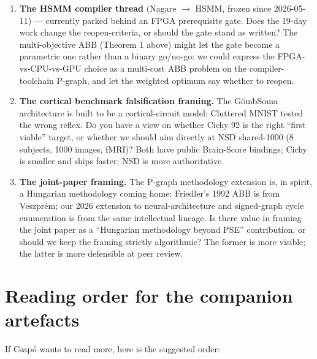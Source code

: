 \documentclass[11pt,a4paper]{article}
\theoremstyle{plain}
\theoremstyle{definition}
\begin{document}
\begin{enumerate}
\item \textbf{The HSMM compiler thread} (Nagare $\to$ HSMM, frozen
      since 2026-05-11) — currently parked behind an FPGA
      prerequisite gate. Does the 19-day work change the
      reopen-criteria, or should the gate stand as written? The
      multi-objective ABB (Theorem 1 above) might let the gate
      become a parametric one rather than a binary go/no-go: we
      could express the FPGA-vs-CPU-vs-GPU choice as a multi-cost
      ABB problem on the compiler-toolchain P-graph, and let the
      weighted optimum say whether to reopen.
\item \textbf{The cortical benchmark falsification framing.} The
      GömbSoma architecture is built to be a cortical-circuit
      model; Cluttered MNIST tested the wrong reflex. Do you have
      a view on whether Cichy 92 is the right ``first viable''
      target, or whether we should aim directly at NSD shared-1000
      (8 subjects, 1000 images, fMRI)? Both have public Brain-Score
      bindings; Cichy is smaller and ships faster; NSD is more
      authoritative.
\item \textbf{The joint-paper framing.} The P-graph methodology
      extension is, in spirit, a Hungarian methodology coming home:
      Friedler's 1992 ABB is from Veszpr\'em; our 2026 extension
      to neural-architecture and signed-graph cycle enumeration is
      from the same intellectual lineage. Is there value in
      framing the joint paper as a ``Hungarian methodology beyond
      PSE'' contribution, or should we keep the framing strictly
      algorithmic? The former is more visible; the latter is more
      defensible at peer review.
\end{enumerate}

\section*{Reading order for the companion artefacts}

If Csap\'o wants to read more, here is the suggested order:
\end{document}
